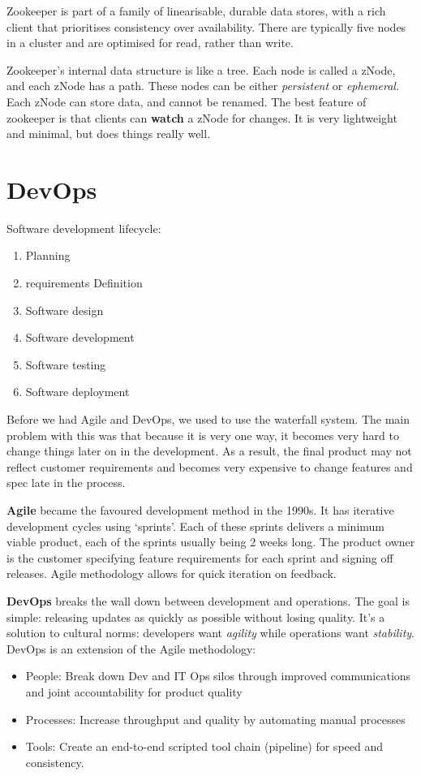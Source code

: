 \documentclass[11pt,a4paper,titlepage,dvipsnames,cmyk]{scrartcl}
\begin{document}
Zookeeper is part of a family of linearisable, durable data stores, with a rich client that prioritises consistency over availability. There are typically five nodes in a cluster and are optimised for read, rather than write.

Zookeeper's internal data structure is like a tree. Each node is called a zNode, and each zNode has a path. These nodes can be either \textit{persistent} or \textit{ephemeral}. Each zNode can store data, and cannot be renamed. The best feature of zookeeper is that clients can \textbf{watch} a zNode for changes. It is very lightweight and minimal, but does things really well.

\section{DevOps}
Software development lifecycle:
\begin{enumerate}
\item Planning
\item requirements Definition
\item Software design
\item Software development
\item Software testing
\item Software deployment
\end{enumerate}

Before we had Agile and DevOps, we used to use the waterfall system. The main problem with this was that because it is very one way, it becomes very hard to change things later on in the development. As a result, the final product may not reflect customer requirements and becomes very expensive to change features and spec late in the process.

\textbf{Agile} became the favoured development method in the 1990s. It has iterative development cycles using `sprints'. Each of these sprints delivers a minimum viable product, each of the sprints usually being 2 weeks long. The product owner is the customer specifying feature requirements for each sprint and signing off releases. Agile methodology allows for quick iteration on feedback.

\textbf{DevOps} breaks the wall down between development and operations. The goal is simple: releasing updates as quickly as possible without losing quality. It's a solution to cultural norms: developers want \textit{agility} while operations want \textit{stability}. DevOps is an extension of the Agile methodology:
\begin{itemize}
    \item People: Break down Dev and IT Ops silos through improved communications and joint accountability for product quality
    \item Processes: Increase throughput and quality by automating manual processes
    \item Tools: Create an end-to-end scripted tool chain (pipeline) for speed and consistency.
\end{itemize}
\end{document}
